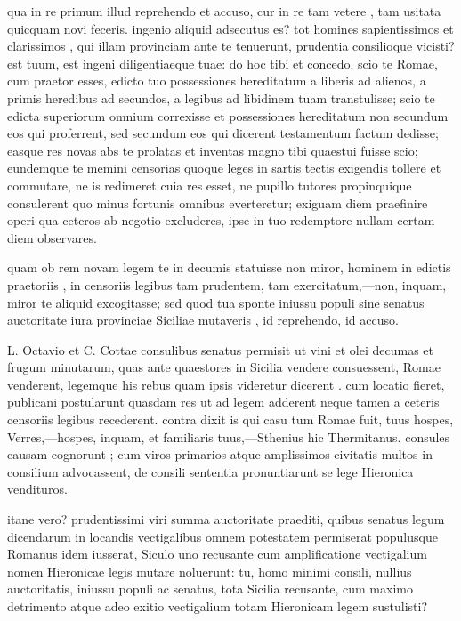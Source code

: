  qua in re primum illud reprehendo et accuso, cur in re tam vetere , tam usitata quicquam novi feceris. ingenio aliquid adsecutus es? tot homines sapientissimos et clarissimos , qui illam provinciam ante te tenuerunt, prudentia consilioque vicisti? est tuum, est ingeni diligentiaeque tuae: do hoc tibi et concedo. scio te Romae, cum praetor esses, edicto tuo possessiones hereditatum a liberis ad alienos, a primis heredibus ad secundos, a legibus ad libidinem tuam transtulisse; scio te edicta superiorum omnium correxisse et possessiones hereditatum non secundum eos qui proferrent, sed secundum eos qui dicerent testamentum factum dedisse; easque res novas abs te prolatas et inventas magno tibi quaestui fuisse scio; eundemque te memini censorias quoque leges in sartis tectis exigendis tollere et commutare, ne is redimeret cuia res esset, ne pupillo tutores propinquique consulerent quo minus fortunis omnibus everteretur; exiguam diem praefinire operi qua ceteros ab negotio excluderes, ipse in tuo redemptore nullam certam diem observares.

 quam ob rem novam legem te in decumis statuisse non miror, hominem in edictis praetoriis , in censoriis legibus tam prudentem, tam exercitatum,—non, inquam, miror te aliquid excogitasse; sed quod tua sponte iniussu populi sine senatus auctoritate iura provinciae Siciliae mutaveris , id reprehendo, id accuso.

 L. Octavio et C. Cottae consulibus senatus permisit ut vini et olei decumas et frugum minutarum, quas ante quaestores in Sicilia vendere consuessent, Romae venderent, legemque his rebus quam ipsis videretur dicerent . cum locatio fieret, publicani postularunt quasdam res ut ad legem adderent neque tamen a ceteris censoriis legibus recederent. contra dixit is qui casu tum Romae fuit, tuus hospes, Verres,—hospes, inquam, et familiaris tuus,—Sthenius hic Thermitanus. consules causam cognorunt ; cum viros primarios atque amplissimos civitatis multos in consilium advocassent, de consili sententia pronuntiarunt se lege Hieronica vendituros.

 itane vero? prudentissimi viri summa auctoritate praediti, quibus senatus legum dicendarum in locandis vectigalibus omnem potestatem permiserat populusque Romanus idem iusserat, Siculo uno recusante cum amplificatione vectigalium nomen Hieronicae legis mutare noluerunt: tu, homo minimi consili, nullius auctoritatis, iniussu populi ac senatus, tota Sicilia recusante, cum maximo detrimento atque adeo exitio vectigalium totam Hieronicam legem sustulisti?

